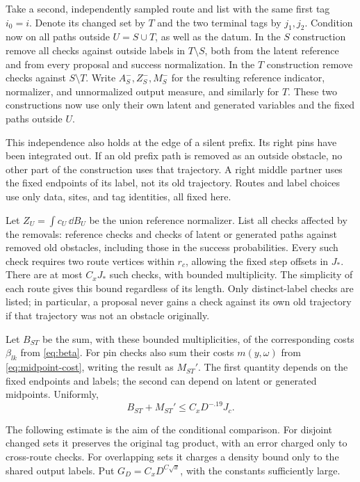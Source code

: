 Take a second, independently sampled route and list with the same
first tag $i_0=i$.  Denote its changed set by $T$ and the two terminal
tags by $j_1,j_2$.  Condition now on all paths outside $U=S\cup T$,
as well as the datum.  In the $S$ construction remove all checks
against outside labels in $T\setminus S$, both from the latent
reference and from every proposal and success normalization.
In the $T$ construction remove checks against $S\setminus T$.
Write $A_S^-,Z_S^-,M_S^-$ for the resulting reference indicator,
normalizer, and unnormalized output measure, and similarly for $T$.
These two constructions now use only their own latent and generated
variables and the fixed paths outside $U$.

This independence also holds at the edge of a silent prefix.  Its
right pins have been integrated out.  If an old prefix path is
removed as an outside obstacle, no other part of the construction
uses that trajectory.  A right middle partner uses the fixed
endpoints of its label, not its old trajectory.  Routes and label
choices use only data, sites, and tag identities, all fixed here.

Let $Z_U=\int c_U\,\dd B_U$ be the union reference normalizer.
List all checks affected by the removals: reference checks and
checks of latent or generated paths against removed old obstacles,
including those in the success probabilities.  Every such check
requires two route vertices within $r_c$, allowing the fixed step
offsets in $J_*$.  There are at most $C_xJ_*$ such checks, with
bounded multiplicity.  The simplicity of each route gives this
bound regardless of its length.  Only distinct-label checks are
listed; in particular, a proposal never gains a check against its
own old trajectory if that trajectory was not an obstacle originally.

Let $B_{ST}$ be the sum, with these bounded multiplicities, of the
corresponding costs $\beta_{lk}$ from \eqref{eq:beta}.  For pin checks
also sum their costs $m(y,\omega)$ from
\eqref{eq:midpoint-cost}, writing the result as $M_{ST}'$.
The first quantity depends on the fixed endpoints and labels; the
second can depend on latent or generated midpoints.  Uniformly,
\begin{equation}\label{eq:cross-check-cost}
 B_{ST}+M_{ST}'\le C_xD^{-.19}J_c.
\end{equation}

The following estimate is the aim of the conditional comparison.  For
disjoint changed sets it preserves the original tag product, with an
error charged only to cross-route checks.  For overlapping sets it
charges a density bound only to the shared output labels.  Put
$G_D=C_xD^{C\sqrt x}$, with the constants sufficiently large.

